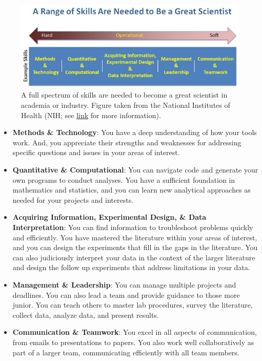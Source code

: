 \documentclass[letterpaper,11pt,oneside]{memoir}
\begin{document}
\begin{figure}
\includegraphics[width=\textwidth]{figures/skillrange.jpg}
\caption{A full spectrum of skills are needed to become a great scientist in academia or industry. Figure taken from the National Institutes of Health (NIH; see \href{https://loop.nigms.nih.gov/2015/11/catalyzing-the-modernization-of-graduate-education/}{link} for more information).}
\end{figure}


\begin{itemize}[noitemsep]
\item \textbf{Methods \& Technology}: You have a deep understanding of how your tools work. And, you appreciate their strengths and weaknesses for addressing specific questions and issues in your areas of interest.
\item \textbf{Quantitative \& Computational}: You can navigate code and generate your own programs to conduct analyses. You have a sufficient foundation in mathematics and statistics, and you can learn new analytical approaches as needed for your projects and interests.
\item \textbf{Acquiring Information, Experimental Design, \& Data Interpretation}: You can find information to troubleshoot problems quickly and efficiently. You have mastered the literature within your areas of interest, and you can design the experiments that fill in the gaps in the literature. You can also judiciously interpret your data in the context of the larger literature and design the follow up experiments that address limitations in your data.
\item \textbf{Management \& Leadership}: You can manage multiple projects and deadlines. You can also lead a team and provide guidance to those more junior. You can teach others to master lab procedures, survey the literature, collect data, analyze data, and present results. 
\item \textbf{Communication \& Teamwork}: You excel in all aspects of communication, from emails to presentations to papers. You also work well collaboratively as part of a larger team, communicating efficiently with all team members. 
\end{itemize}
\end{document}
